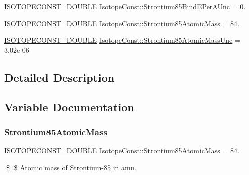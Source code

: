 \begin{DoxyCompactItemize}
\mbox{\hyperlink{group___isotope_const-_macros_ga8f45a7272ce02c0b4c65c44636ed719a}{I\+S\+O\+T\+O\+P\+E\+C\+O\+N\+S\+T\+\_\+\+D\+O\+U\+B\+LE}} \mbox{\hyperlink{group___isotope_const-_strontium-_sr85_ga59714051cd5c786f7ca50049c3525ae4}{Isotope\+Const\+::\+Strontium85\+Bind\+E\+Per\+A\+Unc}} = 0.
\item 
\mbox{\hyperlink{group___isotope_const-_macros_ga8f45a7272ce02c0b4c65c44636ed719a}{I\+S\+O\+T\+O\+P\+E\+C\+O\+N\+S\+T\+\_\+\+D\+O\+U\+B\+LE}} \mbox{\hyperlink{group___isotope_const-_strontium-_sr85_gaeaf409ef487485feae51815ed4f56118}{Isotope\+Const\+::\+Strontium85\+Atomic\+Mass}} = 84.
\item 
\mbox{\hyperlink{group___isotope_const-_macros_ga8f45a7272ce02c0b4c65c44636ed719a}{I\+S\+O\+T\+O\+P\+E\+C\+O\+N\+S\+T\+\_\+\+D\+O\+U\+B\+LE}} \mbox{\hyperlink{group___isotope_const-_strontium-_sr85_ga9476b386308ff77e7b3678e26b00a75c}{Isotope\+Const\+::\+Strontium85\+Atomic\+Mass\+Unc}} = 3.\+02e-\/06
\end{DoxyCompactItemize}


\subsection{Detailed Description}


\subsection{Variable Documentation}
\mbox{\label{group___isotope_const-_strontium-_sr85_gaeaf409ef487485feae51815ed4f56118}} 
\subsubsection{\texorpdfstring{Strontium85\+Atomic\+Mass}{Strontium85AtomicMass}}
{\footnotesize\ttfamily \mbox{\hyperlink{group___isotope_const-_macros_ga8f45a7272ce02c0b4c65c44636ed719a}{I\+S\+O\+T\+O\+P\+E\+C\+O\+N\+S\+T\+\_\+\+D\+O\+U\+B\+LE}} Isotope\+Const\+::\+Strontium85\+Atomic\+Mass = 84.}

\$ \$ Atomic mass of Strontium-\/85 in amu. \mbox{\label{group___isotope_const-_strontium-_sr85_ga9476b386308ff77e7b3678e26b00a75c}} 
